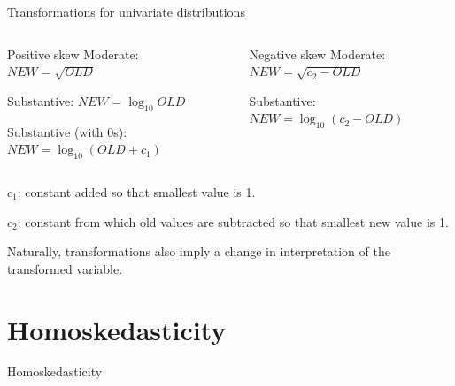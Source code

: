 \documentclass[12pt,english,pdf,xcolor=dvipsnames,aspectratio=169,handout]{beamer}\usepackage[]{graphicx}\usepackage[]{xcolor}
\begin{document}
\begin{frame}{Transformations for univariate distributions}

\begin{columns}[T]
    \begin{column}{.5\textwidth}
     \begin{block}{Positive skew}
       \footnotesize
       Moderate: $NEW=\sqrt{OLD}$

       Substantive: $NEW=\log_{10}OLD$

       Substantive (with 0s): $NEW=\log_{10}(OLD + c_1)$
     \end{block}
    \end{column}
    \begin{column}{.5\textwidth}
    \begin{block}{Negative skew}
      \footnotesize
      Moderate: $NEW = \sqrt{c_2 - OLD}$

      Substantive: $NEW = \log_{10}(c_2 - OLD)$
    \end{block}
    \end{column}
  \end{columns}

  $c_1$: constant added so that smallest value is 1.\bigskip

  $c_2$: constant from which old values are subtracted so that smallest new value is 1.\bigskip

  Naturally, transformations also imply a change in interpretation of the transformed variable.

\end{frame}




\section{Homoskedasticity}

\begin{frame}
\begin{center}
    \Huge Homoskedasticity
\end{center}
\end{frame}
\end{document}
